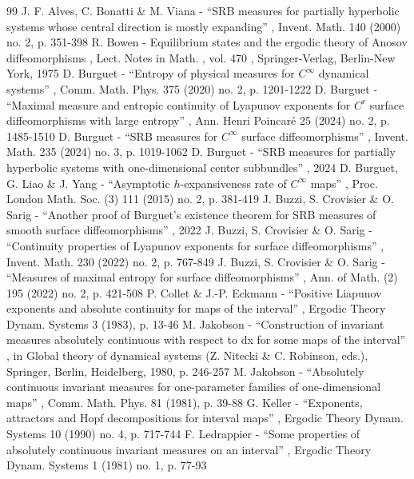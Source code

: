 \documentclass[11pt]{article}
\theoremstyle{definition}
\begin{document}
\begin{thebibliography}{99}
 J. F. Alves, C. Bonatti \& M. Viana - “SRB measures for partially hyperbolic systems whose central direction is mostly expanding” , Invent. Math. 140 (2000) no. 2, p. 351-398
 R. Bowen - Equilibrium states and the ergodic theory of Anosov diffeomorphisms , Lect. Notes in Math. , vol. 470 , Springer-Verlag, Berlin-New York, 1975
 D. Burguet - “Entropy of physical measures for $C^\infty $ dynamical systems” , Comm. Math. Phys. 375 (2020) no. 2, p. 1201-1222
 D. Burguet - “Maximal measure and entropic continuity of Lyapunov exponents for $C^r$ surface diffeomorphisms with large entropy” , Ann. Henri Poincaré 25 (2024) no. 2, p. 1485-1510
 D. Burguet - “SRB measures for $C^\infty $ surface diffeomorphisms” , Invent. Math. 235 (2024) no. 3, p. 1019-1062
 D. Burguet - “SRB measures for partially hyperbolic systems with one-dimensional center subbundles” , 2024
 D. Burguet, G. Liao \& J. Yang - “Asymptotic $h$-expansiveness rate of $C^\infty $ maps” , Proc. London Math. Soc. (3) 111 (2015) no. 2, p. 381-419
 J. Buzzi, S. Crovisier \& O. Sarig - “Another proof of Burguet’s existence theorem for SRB measures of smooth surface diffeomorphisms” , 2022
 J. Buzzi, S. Crovisier \& O. Sarig - “Continuity properties of Lyapunov exponents for surface diffeomorphisms” , Invent. Math. 230 (2022) no. 2, p. 767-849
 J. Buzzi, S. Crovisier \& O. Sarig - “Measures of maximal entropy for surface diffeomorphisms” , Ann. of Math. (2) 195 (2022) no. 2, p. 421-508
 P. Collet \& J.-P. Eckmann - “Positive Liapunov exponents and absolute continuity for maps of the interval” , Ergodic Theory Dynam. Systems 3 (1983), p. 13-46
 M. Jakobson - “Construction of invariant measures absolutely continuous with respect to dx for some maps of the interval” , in Global theory of dynamical systems (Z. Nitecki \& C. Robinson, eds.), Springer, Berlin, Heidelberg, 1980, p. 246-257
 M. Jakobson - “Absolutely continuous invariant measures for one-parameter families of one-dimensional maps” , Comm. Math. Phys. 81 (1981), p. 39-88
 G. Keller - “Exponents, attractors and Hopf decompositions for interval maps” , Ergodic Theory Dynam. Systems 10 (1990) no. 4, p. 717-744
 F. Ledrappier - “Some properties of absolutely continuous invariant measures on an interval” , Ergodic Theory Dynam. Systems 1 (1981) no. 1, p. 77-93

\end{thebibliography}
\end{document}
